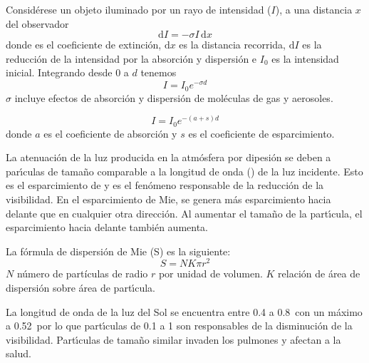 Consid\'erese un objeto iluminado por un rayo de intensidad ($I$), a una distancia $x$ del observador
\begin{equation}
\mathrm{d}I=-\sigma I\, \mathrm{d}x
\end{equation}
donde  es el coeficiente de extinci\'on, $\mathrm{d}x$ es la distancia recorrida, $\mathrm{d}I$ es la reducci\'on de la intensidad por la absorci\'on y dispersi\'on e $I_0$ es la intensidad inicial. Integrando desde 0 a $d$ tenemos
\begin{equation}
I =I_0 e^{-\sigma d}
\end{equation}
$\sigma$ incluye efectos de absorci\'on y dispersi\'on de mol\'eculas de gas y aerosoles.

\begin{equation}
I =I_0 e^{-(a+s)d}
\end{equation}
donde $a$ es el coeficiente de absorci\'on y $s$ es el coeficiente de esparcimiento.

La atenuaci\'on de la luz producida en la atm\'osfera por dipesi\'on se deben a par\'{\i}culas de tama\~no comparable a la longitud de onda () de la luz incidente. Esto es el esparcimiento de  y es el fen\'omeno responsable de la reducci\'on de la visibilidad. En el esparcimiento de Mie, se genera m\'as esparcimiento hacia delante que en cualquier otra direcci\'on. Al aumentar el tama\~no de la part\'{\i}cula, el esparcimiento hacia delante tambi\'en aumenta.


La f\'ormula de dispersi\'on de Mie (S) es la siguiente:
\begin{equation}
S=NK\pi r^2
\end{equation}
$N$ n\'umero de part\'iculas de radio $r$ por unidad de volumen. $K$ relaci\'on de \'area de dispersi\'on sobre \'area de part\'{\i}cula.

La longitud de onda de la luz del Sol se encuentra entre 0.4 a 0.8\micro\metre\,  con un m\'aximo a 0.52\micro\metre\, por lo que part\'{\i}culas de 0.1 a 1{\micro\metre} son responsables de la disminuci\'on de la visibilidad. Part\'{\i}culas de tama\~no similar invaden los pulmones y afectan a la salud.

